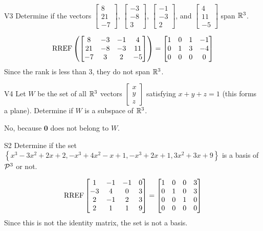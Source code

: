 \documentclass{sbgLAquiz}
\begin{document}
\begin{problem}{V3}
Determine if the vectors  $\begin{bmatrix} 8 \\ 21 \\ -7 \end{bmatrix}$, $\begin{bmatrix} -3 \\ -8 \\ 3 \end{bmatrix}$, $\begin{bmatrix} -1 \\ -3 \\ 2 \end{bmatrix}$, and $\begin{bmatrix} 4 \\ 11 \\ -5 \end{bmatrix}$ span $\IR^3$.
\end{problem}
\begin{solution}
$$\RREF\left(\begin{bmatrix} 8 & -3 & -1 & 4 \\ 21 & -8 & -3 & 11 \\ -7 & 3 & 2 & -5  \end{bmatrix} \right) = \begin{bmatrix} 1 & 0 & 1 & -1 \\ 0 & 1 & 3 & -4 \\ 0 & 0 & 0 & 0\end{bmatrix} $$
Since the rank is less than 3, they do not span $\IR^3$.
\end{solution}

\begin{extract}\newpage\end{extract}
\begin{problem}{V4} Let \(W\) be the set of all \(\IR^3\) vectors
\(\begin{bmatrix} x \\ y \\ z \end{bmatrix}\)
satisfying \(x+y+z=1\) (this forms a plane).
Determine if \(W\) is a subspace of \(\IR^3\).
\end{problem}
\begin{solution}
No, because \(\mathbf{0}\) does not belong to \(W\).
\end{solution}


\begin{problem}{S2}
Determine if the set $\left\{ x^3-3x^2+2x+2, -x^3+4x^2-x+1, -x^3+2x+1, 3x^2+3x+9 \right\}$ is a basis of $\P^3$ or not.
\end{problem}

\begin{solution}
$$\RREF \begin{bmatrix} 1 & -1 & -1 & 0 \\ -3 & 4 & 0 & 3 \\ 2 & -1 & 2 & 3 \\ 2 & 1 & 1 & 9 \end{bmatrix}=\begin{bmatrix} 1 &0 & 0 & 3 \\ 0 & 1 & 0 & 3 \\ 0 & 0 & 1 & 0 \\ 0 & 0 & 0 & 0 \end{bmatrix}$$
Since this is not the identity matrix, the set is not a basis.
\end{solution}
\end{document}
